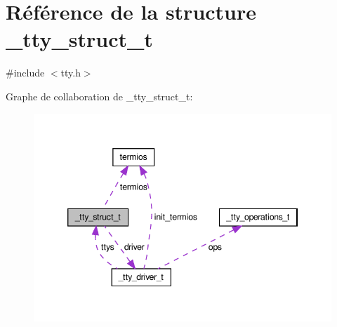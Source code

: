 \hypertarget{struct__tty__struct__t}{\section{Référence de la structure \+\_\+tty\+\_\+struct\+\_\+t}
\label{struct__tty__struct__t}
}


{\ttfamily \#include $<$tty.\+h$>$}



Graphe de collaboration de \+\_\+tty\+\_\+struct\+\_\+t\+:\nopagebreak
\begin{figure}[H]
\begin{center}
\leavevmode
\includegraphics[width=346pt]{struct__tty__struct__t__coll__graph}
\end{center}
\end{figure}
